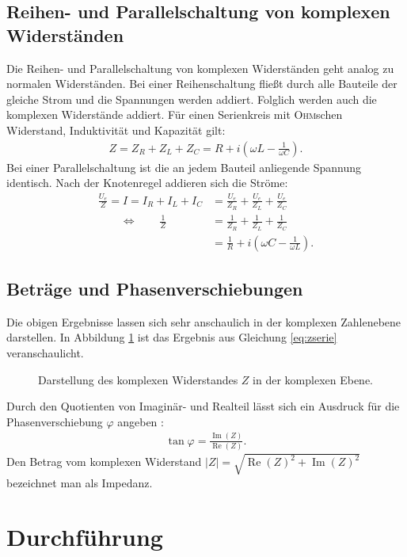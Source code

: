 \documentclass[12pt,a4paper,titlepage,headinclude]{scrartcl}
\newcommand{\aeqiv}{\ensuremath{\qquad \Longleftrightarrow \qquad}} %
\newcommand{\person}[1]{\textsc{#1}}
\begin{document}
\subsection{Reihen- und Parallelschaltung von komplexen Widerständen}
Die Reihen- und Parallelschaltung von komplexen Widerständen geht analog zu normalen Widerständen. Bei einer Reihenschaltung fließt durch alle Bauteile der gleiche Strom und die Spannungen werden addiert. Folglich werden auch die komplexen Widerstände addiert. Für einen Serienkreis mit \person{Ohm}schen Widerstand, Induktivität und Kapazität gilt:
\begin{align}
	Z=Z_R+Z_L+Z_C=R+i\left( \omega L-\frac{1}{\omega C} \right).
	\label{eq:zserie}
\end{align}
Bei einer Parallelschaltung ist die an jedem Bauteil anliegende Spannung identisch. Nach der Knotenregel \cite[55]{demtroeder2} addieren sich die Ströme:
\begin{align}
	\frac{U_e}{Z}=I=I_R+I_L+I_C&=\frac{U_e}{Z_R}+\frac{U_e}{Z_L}+\frac{U_e}{Z_C}\\
	\aeqiv \frac{1}{Z}&=\frac{1}{Z_R}+\frac{1}{Z_L}+\frac{1}{Z_C}\\
	&=\frac{1}{R}+i\left( \omega C- \frac{1}{\omega L}\right).
	\label{eq:zpara}
\end{align}
\subsection{Beträge und Phasenverschiebungen}
Die obigen Ergebnisse lassen sich sehr anschaulich in der komplexen Zahlenebene darstellen. In Abbildung \ref{fig:theozeiger} ist das Ergebnis aus Gleichung \eqref{eq:zserie} veranschaulicht. 
\begin{figure}[htb]
	\centering
	
	\caption{Darstellung des komplexen Widerstandes $Z$ in der komplexen Ebene.}
	\label{fig:theozeiger}
\end{figure}
Durch den Quotienten von Imaginär- und Realteil lässt sich ein Ausdruck für die Phasenverschiebung $\varphi$ angeben \cite[153]{demtroeder2}:
\begin{align}
	\tan\varphi=\frac{\operatorname{Im}(Z)}{\operatorname{Re}(Z)}.
	\label{eq:phase}
\end{align}
Den Betrag vom komplexen Widerstand $|Z|=\sqrt{\operatorname{Re}(Z)^2+\operatorname{Im}(Z)^2}$ bezeichnet man als Impedanz.
\section{Durchführung}
\label{sec:durchfuehrung}
\end{document}
